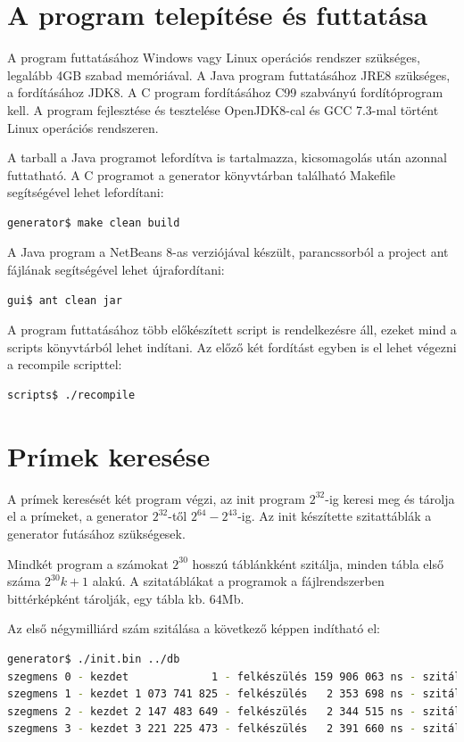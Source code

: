 \documentclass[12pt]{report}
\begin{document}
\section{A program telepítése és futtatása}

A program futtatásához Windows vagy Linux operációs rendszer szükséges,
legalább 4GB szabad memóriával.
A Java program futtatásához JRE8 szükséges, a fordításához JDK8.
A C program fordításához C99 szabványú fordítóprogram kell.
A program fejlesztése és tesztelése OpenJDK8-cal és GCC 7.3-mal történt
Linux operációs rendszeren.

A tarball a Java programot lefordítva is tartalmazza,
kicsomagolás után azonnal futtatható.
A C programot a generator könyvtárban található Makefile segítségével lehet lefordítani:
{\tiny
\begin{lstlisting}[language=bash]
generator$ make clean build
\end{lstlisting}
}

A Java program a NetBeans 8-as verziójával készült,
parancssorból a project ant fájlának segítségével lehet
újrafordítani:
{\tiny
\begin{lstlisting}[language=bash]
gui$ ant clean jar
\end{lstlisting}
}

A program futtatásához több előkészített script is rendelkezésre áll,
ezeket mind a scripts könyvtárból lehet indítani.
Az előző két fordítást egyben is el lehet végezni a recompile scripttel:
{\tiny
\begin{lstlisting}[language=bash]
scripts$ ./recompile
\end{lstlisting}
}

\section{Prímek keresése}

A prímek keresését két program végzi, az init program
$2^{32}$-ig keresi meg és tárolja el a prímeket,
a generator $2^{32}$-től $2^{64}-2^{43}$-ig.
Az init készítette szitattáblák a generator futásához szükségesek.

Mindkét program a számokat $2^{30}$ hosszú táblánkként szitálja,
minden tábla első száma $2^{30}k+1$ alakú. A szitatáblákat a programok a
fájlrendszerben bittérképként tárolják, egy tábla kb. $64$Mb.

Az első négymilliárd szám szitálása a következő képpen indítható el:

{\tiny
\begin{lstlisting}[language=bash]
generator$ ./init.bin ../db
szegmens 0 - kezdet             1 - felkészülés 159 906 063 ns - szitálás 1 122 878 403 ns
szegmens 1 - kezdet 1 073 741 825 - felkészülés   2 353 698 ns - szitálás 1 171 101 336 ns
szegmens 2 - kezdet 2 147 483 649 - felkészülés   2 344 515 ns - szitálás 1 188 330 478 ns
szegmens 3 - kezdet 3 221 225 473 - felkészülés   2 391 660 ns - szitálás 1 199 900 603 ns
\end{lstlisting}
}
\end{document}
